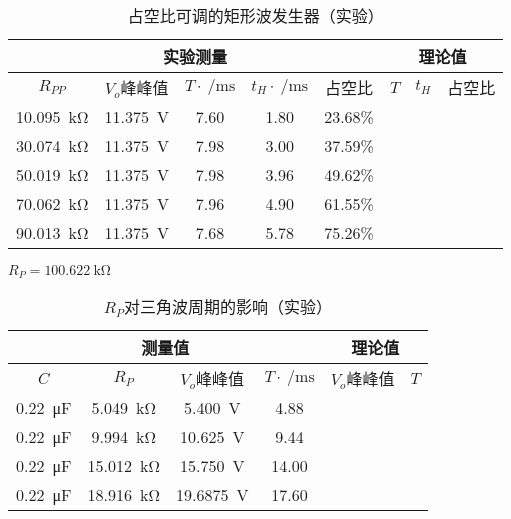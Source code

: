 \documentclass[UTF8]{ctexart}
\numberwithin{figure}{subsection}
\numberwithin{table}{subsection}
\numberwithin{equation}{subsection}
\begin{document}
\begin{table}[h]
    \begin{center}
        \caption{占空比可调的矩形波发生器（实验）}
        \begin{tabular}{|c|c|c|c|c|c|c|c|}
            \hline
            \multicolumn{5}{|c|}{实验测量} & \multicolumn{3}{c|}{理论值} \\
            \hline
            \(R_{PP}\) & \(V_o\)峰峰值 & \(T\cdot\SI{}{\per\milli\second}\) & \(t_H\cdot\SI{}{\per\milli\second}\) & 占空比 & \(T\) & \(t_H\) & 占空比 \\
            \hline
            \SI{10.095}{\kilo\ohm} & \SI{11.375}{\volt} & 7.60 & 1.80 & 23.68\% & & & \\
            \hline
            \SI{30.074}{\kilo\ohm} & \SI{11.375}{\volt} & 7.98 & 3.00 & 37.59\% & & & \\
            \hline
            \SI{50.019}{\kilo\ohm} & \SI{11.375}{\volt} & 7.98 & 3.96 & 49.62\% & & & \\
            \hline
            \SI{70.062}{\kilo\ohm} & \SI{11.375}{\volt} & 7.96 & 4.90 & 61.55\% & & & \\
            \hline
            \SI{90.013}{\kilo\ohm} & \SI{11.375}{\volt} & 7.68 & 5.78 & 75.26\% & & & \\
            \hline
        \end{tabular}
        \par \(R_P = \SI{100.622}{\kilo\ohm}\)
    \end{center}
\end{table}

\begin{table}[h]
    \begin{center}
        \caption{\(R_P\)对三角波周期的影响（实验）}
        \begin{tabular}{|c|c|c|c|c|c|}
            \hline
            \multicolumn{4}{|c|}{测量值} & \multicolumn{2}{c|}{理论值} \\
            \hline
            \(C\) & \(R_P\) & \(V_o\)峰峰值 & \(T\cdot\SI{}{\per\milli\second}\) & \(V_o\)峰峰值 & \(T\) \\
            \hline
            \SI{0.22}{\micro\farad} & \SI{5.049}{\kilo\ohm} & \SI{5.400}{\volt} & 4.88 & & \\
            \hline
            \SI{0.22}{\micro\farad} & \SI{9.994}{\kilo\ohm} & \SI{10.625}{\volt} & 9.44 & & \\
            \hline
            \SI{0.22}{\micro\farad} & \SI{15.012}{\kilo\ohm} & \SI{15.750}{\volt} & 14.00 & & \\
            \hline
            \SI{0.22}{\micro\farad} & \SI{18.916}{\kilo\ohm} & \SI{19.6875}{\volt} & 17.60 & & \\
            \hline
        \end{tabular}
    \end{center}
\end{table}
\end{document}

